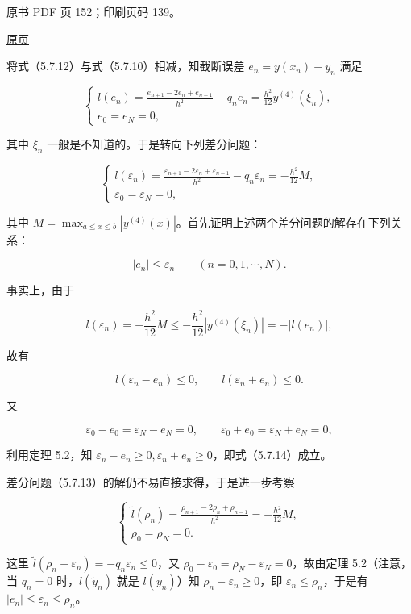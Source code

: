 \clearpage

原书 PDF 页 152；印刷页码 139。

\href{source-images/pdf-152.jpeg}{原页}

将式（5.7.12）与式（5.7.10）相减，知截断误差 \(e_n=y(x_n)-y_n\) 满足

\[
\begin{cases}
\displaystyle l(e_n)=\frac{e_{n+1}-2e_n+e_{n-1}}{h^2}-q_ne_n=\frac{h^2}{12}y^{(4)}(\xi_n),\\[6pt]
e_0=e_N=0,
\end{cases}
\]

其中 \(\xi_n\) 一般是不知道的。于是转向下列差分问题：

\[
\begin{cases}
\displaystyle l(\varepsilon_n)=\frac{\varepsilon_{n+1}-2\varepsilon_n+\varepsilon_{n-1}}{h^2}-q_n\varepsilon_n=-\frac{h^2}{12}M,\\[6pt]
\varepsilon_0=\varepsilon_N=0,
\end{cases}
\tag{5.7.13}
\]

其中 \(M=\max_{a\le x\le b}|y^{(4)}(x)|\)。首先证明上述两个差分问题的解存在下列关系：

\[
|e_n|\le\varepsilon_n\qquad(n=0,1,\cdots,N).
\tag{5.7.14}
\]

事实上，由于

\[
l(\varepsilon_n)=-\frac{h^2}{12}M\le-\frac{h^2}{12}|y^{(4)}(\xi_n)|=-|l(e_n)|,
\]

故有

\[
l(\varepsilon_n-e_n)\le0,\qquad l(\varepsilon_n+e_n)\le0.
\]

又

\[
\varepsilon_0-e_0=\varepsilon_N-e_N=0,\qquad\varepsilon_0+e_0=\varepsilon_N+e_N=0,
\]

利用定理 5.2，知 \(\varepsilon_n-e_n\ge0,\varepsilon_n+e_n\ge0\)，即式（5.7.14）成立。

差分问题（5.7.13）的解仍不易直接求得，于是进一步考察

\[
\begin{cases}
\displaystyle\tilde l(\rho_n)=\frac{\rho_{n+1}-2\rho_n+\rho_{n-1}}{h^2}=-\frac{h^2}{12}M,\\[6pt]
\rho_0=\rho_N=0.
\end{cases}
\tag{5.7.15}
\]

这里 \(\tilde l(\rho_n-\varepsilon_n)=-q_n\varepsilon_n\le0\)，又 \(\rho_0-\varepsilon_0=\rho_N-\varepsilon_N=0\)，故由定理 5.2（注意，当 \(q_n=0\) 时，\(l(\tilde y_n)\) 就是 \(l(y_n)\)）知 \(\rho_n-\varepsilon_n\ge0\)，即 \(\varepsilon_n\le\rho_n\)，于是有 \(|e_n|\le\varepsilon_n\le\rho_n\)。

